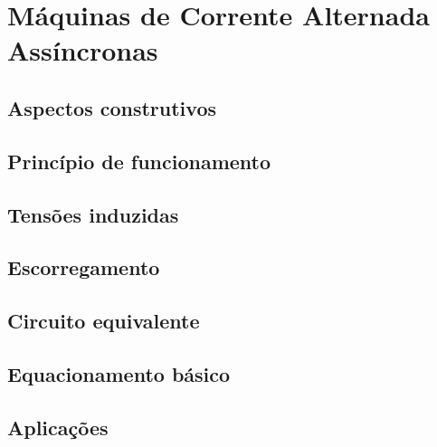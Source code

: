 \section{Máquinas de Corrente Alternada Assíncronas}



\subsection{Aspectos construtivos}



\subsection{Princípio de funcionamento}



\subsection{Tensões induzidas}



\subsection{Escorregamento}



\subsection{Circuito equivalente}



\subsection{Equacionamento básico}



\subsection{Aplicações}



